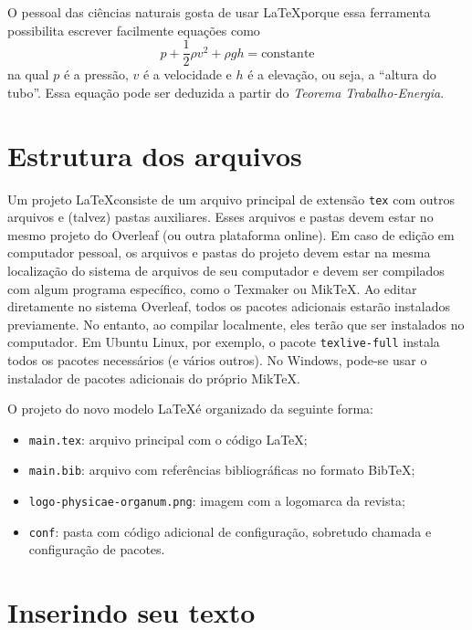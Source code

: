 \documentclass[12pt,a4paper,twoside]{article}
\begin{document}
O pessoal das ciências naturais gosta de usar \LaTeX porque essa ferramenta possibilita escrever facilmente equações como
\begin{equation}
 p+\frac{1}{2}{\rho}v^2+{\rho}gh = \text{constante}
 \label{eq:Bernoulli}
\end{equation}
na qual $p$ é a pressão, $v$ é a velocidade e $h$ é a elevação, ou seja, a “altura do tubo”. Essa equação pode ser deduzida a partir do \textit{Teorema Trabalho-Energia}.

\section{Estrutura dos arquivos}

Um projeto \LaTeX consiste de um arquivo principal de extensão \verb|tex| com outros arquivos e (talvez) pastas auxiliares. Esses arquivos e pastas devem estar no mesmo projeto do Overleaf (ou outra plataforma online). Em caso de edição em computador pessoal, os arquivos e pastas do projeto devem estar na mesma localização do sistema de arquivos de seu computador e devem ser compilados com algum programa específico, como o Texmaker ou MikTeX. Ao editar diretamente no sistema Overleaf, todos os pacotes adicionais estarão instalados previamente. No entanto, ao compilar localmente, eles terão que ser instalados no computador. Em Ubuntu Linux, por exemplo, o pacote \verb|texlive-full| instala todos os pacotes necessários (e vários outros). No Windows, pode-se usar o instalador de pacotes adicionais do próprio MikTeX.

O projeto do novo modelo \LaTeX é organizado da seguinte forma:

\begin{itemize}
    \item \verb|main.tex|: arquivo principal com o código \LaTeX;
    \item \verb|main.bib|: arquivo com referências bibliográficas no formato BibTeX;
    \item \verb|logo-physicae-organum.png|: imagem com a logomarca da revista;
    \item \verb|conf|: pasta com código adicional de configuração, sobretudo chamada e configuração de pacotes.
\end{itemize}


\section{Inserindo seu texto}
\end{document}
